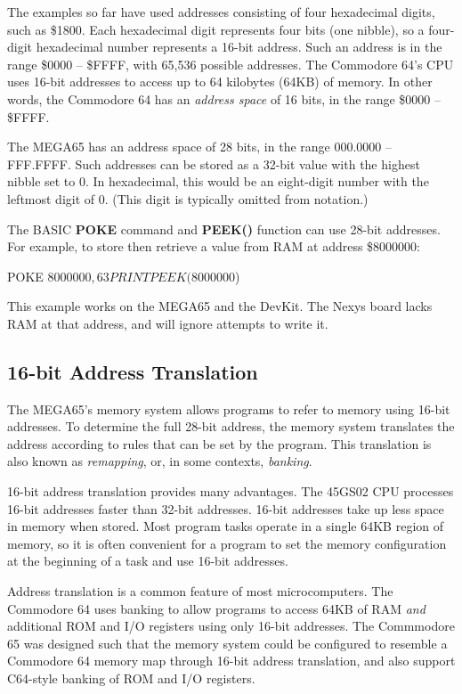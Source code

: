 The examples so far have used addresses consisting of four hexadecimal digits,
such as \$1800. Each hexadecimal digit represents four bits (one nibble), so a
four-digit hexadecimal number represents a 16-bit address. Such an address is
in the range \$0000 -- \$FFFF, with 65,536 possible addresses. The Commodore
64's CPU uses 16-bit addresses to access up to 64 kilobytes (64KB) of memory.
In other words, the Commodore 64 has an \emph{address space} of 16 bits, in the
range \$0000 -- \$FFFF.

The MEGA65 has an address space of 28 bits, in the
range 000.0000 -- FFF.FFFF. Such addresses can be stored as a 32-bit value with
the highest nibble set to 0. In hexadecimal, this would be an
eight-digit number with the leftmost digit of 0. (This digit is typically
omitted from notation.)

The BASIC {\bf POKE} command and {\bf PEEK()} function can use 28-bit
addresses. For example, to store then retrieve a value from RAM at address \$8000000:

\begin{basiccode}
POKE $8000000,63
PRINT PEEK($8000000)
\end{basiccode}

This example works on the MEGA65 and the DevKit. The Nexys board lacks RAM
at that address, and will ignore attempts to write it.

\subsection{16-bit Address Translation}

The MEGA65's memory system allows programs to refer to memory using 16-bit
addresses. To determine the full 28-bit address, the memory system translates
the address according to rules that can be set by the program. This translation
is also known as {\em remapping}, or, in some contexts, {\em
banking}.

16-bit address translation provides many advantages. The 45GS02 CPU processes
16-bit addresses faster than 32-bit addresses. 16-bit addresses take up less
space in memory when stored. Most program tasks operate in a single 64KB region
of memory, so it is often convenient for a program to set the memory
configuration at the beginning of a task and use 16-bit addresses.

Address translation is a common feature of most microcomputers. The Commodore
64 uses banking to allow programs to access 64KB of RAM {\em and} additional
ROM and I/O registers using only 16-bit addresses. The Commmodore 65 was
designed such that the memory system could be configured to resemble a
Commodore 64 memory map through 16-bit address translation, and also support
C64-style banking of ROM and I/O registers.


